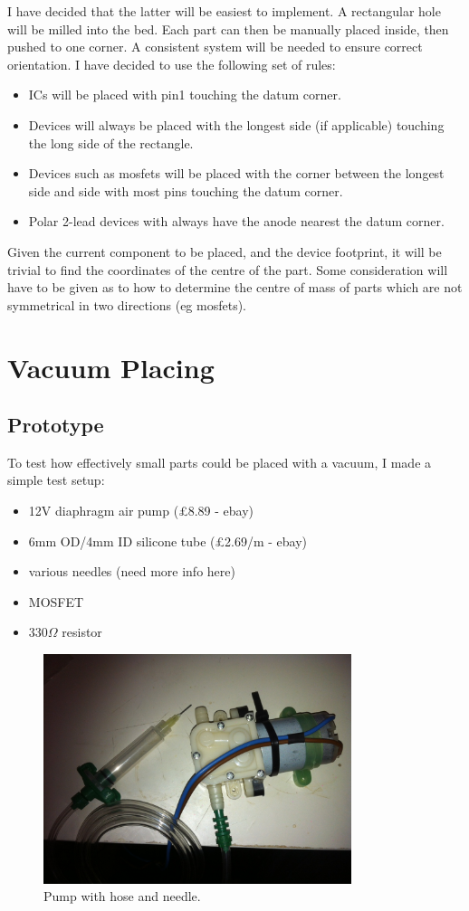\documentclass[a4paper,11pt]{article}  %
\begin{document}
I have decided that the latter will be easiest to implement. A rectangular hole will be milled into the bed. Each part can then
be manually placed inside, then pushed to one corner. A consistent system will be needed to ensure correct orientation. I have decided to use
the following set of rules:

\begin{itemize} \itemsep0em
	\item	ICs will be placed with pin1 touching the datum corner.
	\item	Devices will always be placed with the longest side (if applicable) touching the long side of the rectangle.
	\item	Devices such as mosfets will be placed with the corner between the longest side and side with most pins touching the datum corner.
	\item	Polar 2-lead devices with always have the anode nearest the datum corner.
\end{itemize}

Given the current component to be placed, and the device footprint, it will be trivial to find the coordinates of the centre of the part. Some
consideration will have to be given as to how to determine the centre of mass of parts which are not symmetrical in two directions (eg mosfets).
	   
\section{Vacuum Placing}
\subsection{Prototype}
To test how effectively small parts could be placed with a vacuum, I made a simple test setup:

\begin{itemize} \itemsep0em
	\item	12V diaphragm air pump (£8.89 - ebay)
	\item	6mm OD/4mm ID silicone tube (£2.69/m - ebay)
	\item	various needles (need more info here)
	\item	MOSFET
	\item	330$\Omega$ resistor
\end{itemize}

\begin{figure}[ht!]
\centering
\includegraphics[width=90mm]{resources/pump_and_hose.jpg}
\caption{Pump with hose and needle.}
\label{hose and needle}
\end{figure}
\end{document}
